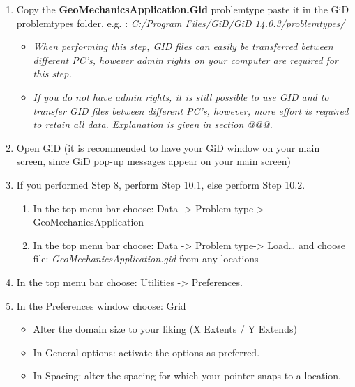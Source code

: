 \begin{enumerate}
	\item Copy the \textbf{GeoMechanicsApplication.Gid} problemtype paste it in the GiD problemtypes folder, e.g. : \textit{C:/Program Files/GiD/GiD 14.0.3/problemtypes/} 
	
	\begin{itemize}
		\setlength\itemsep{2mm}
		\item \textit{When performing this step, GID files can easily be transferred between different PC’s, however admin rights on your computer are required for this step.}
		
		\item  \textit{If you do not have admin rights, it is still possible to use GID and to transfer GID files between different PC’s, however, more effort is required to retain all data. Explanation is given in section @@@.}
	\end{itemize}
	
	\item Open GiD (it is recommended to have your GiD window on your main screen, since GiD pop-up messages appear on your main screen)
	
	\item If you performed Step 8, perform Step 10.1, else perform Step 10.2. 
	\begin{enumerate}
		\item In the top menu bar choose: Data ->  Problem type-> GeoMechanicsApplication
		
		\item In the top menu bar choose: Data ->  Problem type-> Load…  and choose file: \textit{GeoMechanicsApplication.gid} from any locations  	
	\end{enumerate}
	\item In the top menu bar choose:  Utilities ->  Preferences.
	\item In the Preferences window choose: Grid
	\begin{itemize}
		\setlength\itemsep{2mm}
		\item Alter the domain size to your liking (X Extents / Y Extends)
		\item In General options: activate the options as preferred.
		\item In Spacing: alter the spacing for which your pointer snaps to a location.
	\end{itemize}

	
\end{enumerate}

